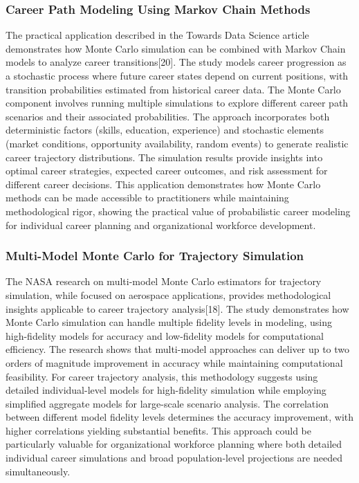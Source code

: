 \documentclass[main.tex]{subfiles}
\begin{document}
\subsubsection{Career Path Modeling Using Markov Chain Methods}

The practical application described in the Towards Data Science article demonstrates how Monte Carlo simulation can be combined with Markov Chain models to analyze career transitions[20]. The study models career progression as a stochastic process where future career states depend on current positions, with transition probabilities estimated from historical career data. The Monte Carlo component involves running multiple simulations to explore different career path scenarios and their associated probabilities. The approach incorporates both deterministic factors (skills, education, experience) and stochastic elements (market conditions, opportunity availability, random events) to generate realistic career trajectory distributions. The simulation results provide insights into optimal career strategies, expected career outcomes, and risk assessment for different career decisions. This application demonstrates how Monte Carlo methods can be made accessible to practitioners while maintaining methodological rigor, showing the practical value of probabilistic career modeling for individual career planning and organizational workforce development.

\subsubsection{Multi-Model Monte Carlo for Trajectory Simulation}

The NASA research on multi-model Monte Carlo estimators for trajectory simulation, while focused on aerospace applications, provides methodological insights applicable to career trajectory analysis[18]. The study demonstrates how Monte Carlo simulation can handle multiple fidelity levels in modeling, using high-fidelity models for accuracy and low-fidelity models for computational efficiency. The research shows that multi-model approaches can deliver up to two orders of magnitude improvement in accuracy while maintaining computational feasibility. For career trajectory analysis, this methodology suggests using detailed individual-level models for high-fidelity simulation while employing simplified aggregate models for large-scale scenario analysis. The correlation between different model fidelity levels determines the accuracy improvement, with higher correlations yielding substantial benefits. This approach could be particularly valuable for organizational workforce planning where both detailed individual career simulations and broad population-level projections are needed simultaneously.
\end{document}
